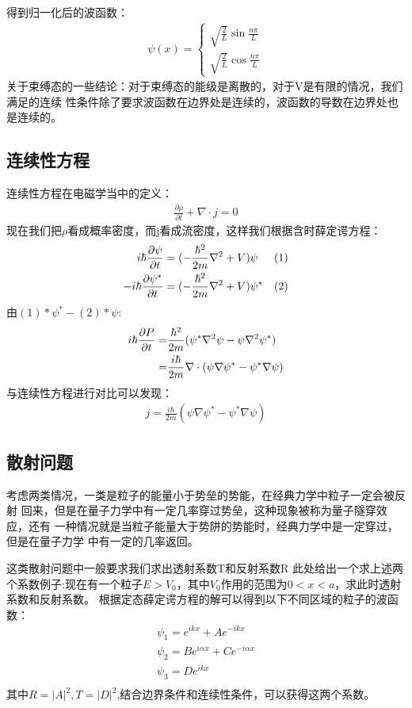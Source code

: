 \documentclass[UTF8]{article}
\numberwithin{equation}{section}
\begin{document}
得到归一化后的波函数：
\begin{align*}
    \psi(x)=\begin{cases}
                \sqrt{\frac{2}{L}} \sin \frac{n\pi}{L} \\
                \sqrt{\frac{2}{L}} \cos \frac{n\pi}{L}
            \end{cases}
\end{align*}
关于束缚态的一些结论：对于束缚态的能级是离散的，对于V是有限的情况，我们满足的连续
性条件除了要求波函数在边界处是连续的，波函数的导数在边界处也是连续的。
\subsection{连续性方程}
连续性方程在电磁学当中的定义：
\begin{align*}
    \frac{\partial \rho}{\partial t}+\nabla \cdot j=0
\end{align*}
现在我们把$\rho$看成概率密度，而j看成流密度，这样我们根据含时薛定谔方程：
\begin{align*}
    i\hbar \pdv{\psi}{t}&=(-\frac{\hbar^2}{2m}\nabla^2+V)\psi  &(1) \\
    -i\hbar \pdv{\psi^*}{t}&=(-\frac{\hbar^2}{2m}\nabla^2+V)\psi^* &(2)
\end{align*}
由$(1)*\psi^*-(2)*\psi:$
\begin{align*}
    i\hbar\pdv{P}{t}= & \frac{\hbar^2}{2m}(\psi^*\nabla^2 \psi-\psi\nabla^2 \psi^*)     \\
    =                 & \frac{i\hbar}{2m}\nabla\cdot(\psi\nabla\psi^*-\psi^*\nabla\psi)
\end{align*}
与连续性方程进行对比可以发现：
\begin{align*}
    j=\frac{i\hbar}{2m}(\psi\nabla\psi^*-\psi^*\nabla\psi)
\end{align*}
\subsection{散射问题}
考虑两类情况，一类是粒子的能量小于势垒的势能，在经典力学中粒子一定会被反射
回来，但是在量子力学中有一定几率穿过势垒，这种现象被称为量子隧穿效应，还有
一种情况就是当粒子能量大于势阱的势能时，经典力学中是一定穿过，但是在量子力学
中有一定的几率返回。

这类散射问题中一般要求我们求出透射系数T和反射系数R\newline
此处给出一个求上述两个系数例子:现在有一个粒子$E>V_0$，其中$V_0$作用的范围为$0<x<a$，求此时透射系数和反射系数。\newline
根据定态薛定谔方程的解可以得到以下不同区域的粒子的波函数：
$$
    \begin{array}{l}
        \psi _1=e^{ikx}+Ae^{-ikx}              \\
        \psi _2=Be^{i\alpha x}+Ce^{-i\alpha x} \\
        \psi _3=De^{ikx}                       \\
    \end{array}
$$
其中$R=|A|^2,T = |D|^2$,结合边界条件和连续性条件，可以获得这两个系数。
\end{document}
